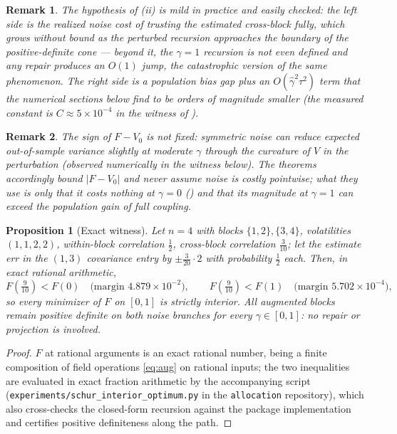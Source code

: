 \documentclass[11pt]{article}
\newtheorem{proposition}{Proposition}
\newtheorem{remark}{Remark}
\begin{document}
\begin{remark}
The hypothesis of (ii) is mild in practice and easily
checked: the left side is the realized noise cost of trusting the estimated
cross-block fully, which grows without bound as the perturbed recursion
approaches the boundary of the positive-definite cone --- beyond it, the
$\gamma = 1$ recursion is not even defined and any repair produces an $O(1)$
jump, the catastrophic version of the same phenomenon. The right side is a
population bias gap plus an $O(\hat\gamma^2\tau^2)$ term that the numerical
sections below find to be orders of magnitude smaller (the measured constant
is $C \approx 5\times10^{-4}$ in the witness of ).
\end{remark}

\begin{remark}
The sign of $F - V_0$ is \emph{not} fixed: symmetric noise can reduce expected
out-of-sample variance slightly at moderate $\gamma$ through the curvature of
$V$ in the perturbation (observed numerically in the witness below). The
theorems accordingly bound $|F - V_0|$ and never assume noise is costly
pointwise; what they use is only that it costs nothing at $\gamma = 0$
() and that its magnitude at $\gamma = 1$ can exceed the
population gain of full coupling.
\end{remark}

\begin{proposition}[Exact witness]
\label{prop:witness}
Let $n = 4$ with blocks $\{1,2\}, \{3,4\}$, volatilities $(1,1,2,2)$,
within-block correlation $\tfrac12$, cross-block correlation $\tfrac{3}{10}$;
let the estimate err in the $(1,3)$ covariance entry by $\pm\tfrac{3}{20}
\cdot 2$ with probability $\tfrac12$ each. Then, in exact rational arithmetic,
\[
  F(\tfrac{9}{10}) < F(0) \quad\text{(margin } 4.879\times10^{-2}\text{)},
  \qquad
  F(\tfrac{9}{10}) < F(1) \quad\text{(margin } 5.702\times10^{-4}\text{)},
\]
so every minimizer of $F$ on $[0,1]$ is strictly interior. All augmented
blocks remain positive definite on both noise branches for every
$\gamma \in [0,1]$: no repair or projection is involved.
\end{proposition}
\begin{proof}
$F$ at rational arguments is an exact rational number, being a finite
composition of field operations \eqref{eq:aug} on rational inputs; the two
inequalities are evaluated in exact fraction arithmetic by the accompanying
script (\texttt{experiments/schur\_interior\_optimum.py} in the
\texttt{allocation} repository), which also cross-checks the closed-form
recursion against the package implementation and certifies positive
definiteness along the path.
\end{proof}
\end{document}
